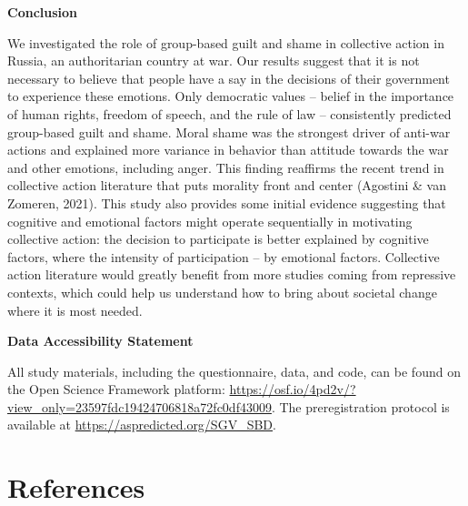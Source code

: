 \documentclass[
]{article}
\begin{document}
\textbf{Conclusion}

We investigated the role of group-based guilt and shame in collective action in Russia, an authoritarian country at war. Our results suggest that it is not necessary to believe that people have a say in the decisions of their government to experience these emotions. Only democratic values -- belief in the importance of human rights, freedom of speech, and the rule of law -- consistently predicted group-based guilt and shame. Moral shame was the strongest driver of anti-war actions and explained more variance in behavior than attitude towards the war and other emotions, including anger. This finding reaffirms the recent trend in collective action literature that puts morality front and center (Agostini \& van Zomeren, 2021). This study also provides some initial evidence suggesting that cognitive and emotional factors might operate sequentially in motivating collective action: the decision to participate is better explained by cognitive factors, where the intensity of participation -- by emotional factors. Collective action literature would greatly benefit from more studies coming from repressive contexts, which could help us understand how to bring about societal change where it is most needed.

\textbf{Data Accessibility Statement}

All study materials, including the questionnaire, data, and code, can be found on the Open Science Framework platform: \url{https://osf.io/4pd2v/?view_only=23597fdc19424706818a72fc0df43009}. The preregistration protocol is available at \url{https://aspredicted.org/SGV_SBD}.

\vspace{10mm}

\section*{References}\label{references}
\end{document}
